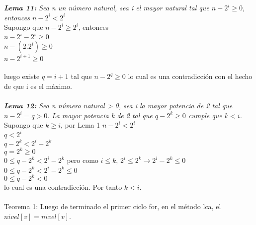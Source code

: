 \documentclass[12pt]{article}
\begin{document}
\textit{ \textbf{Lema 11:} Sea n un n\'umero natural, sea i el mayor natural tal que $n-2^i \geq 0$, entonces $n - 2^i < 2^i$}\\
Supongo que $n - 2^i \geq 2^i$, entonces\\
            $n - 2^i - 2^i \geq 0$\\
            $n - (2.2^i) \geq 0$\\
            $n - 2^{i+1} \geq 0$\\
\\
luego existe $q = i + 1$ tal que $n - 2^q \geq 0$ lo cual es una contradicci\'on con el hecho de que i es el m\'aximo.\\
\\



\textit{ \textbf{Lema 12:} Sea n n\'umero natural > 0, sea i la mayor potencia de 2 tal que $n-2^i = q>0$. La mayor potencia k de 2 tal que $q-2^k \geq 0$ cumple que $k < i$.}
\\
Supongo que $k \geq i$, por Lema 1 $n - 2^i < 2^i$\\
            $q < 2^i$\\
            $q-2^k < 2^i - 2^k$ \\
            $q = 2^k \geq 0$\\
            $0 \leq q - 2^k < 2^i - 2^k$ pero como $i \leq k$, $2^i \leq 2^k \rightarrow 2^i - 2^k \leq 0$\\
            $0 \leq q - 2^k < 2^i - 2^k \leq 0$\\
            $0 \leq q - 2^k < 0$\\
lo cual es una contradicci\'on. Por tanto $k < i$.\\
\\



Teorema 1: Luego de terminado el primer ciclo for,  en el m\'etodo lca, el $nivel [v] = nivel[v]$. \\
\end{document}
